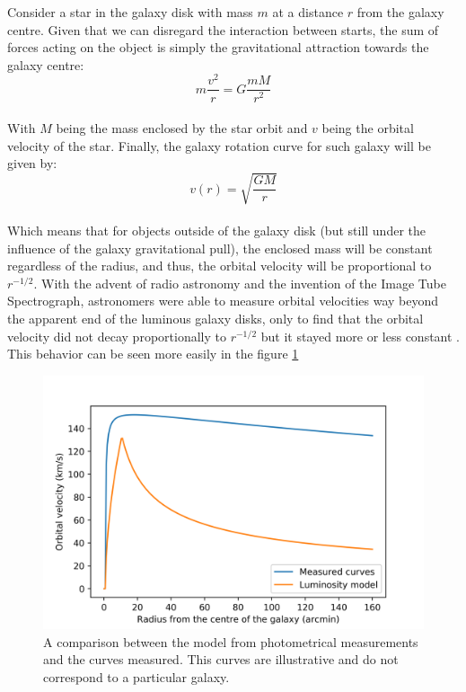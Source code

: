 Consider a star in the galaxy disk with mass $m$ at a distance $r$ from the galaxy centre. Given that we can disregard the interaction between starts, the sum of forces acting on the object is simply the gravitational attraction towards the galaxy centre:\\
\begin{equation}
\label{heh}
m\frac{v^2}{r} = G \frac{mM}{r^2}
\end{equation}\\

With $M$ being the mass enclosed by the star orbit and $v$ being the orbital velocity of the star. Finally, the galaxy rotation curve for such galaxy will be given by:\\

\begin{equation}
v(r) = \sqrt{\frac{GM}{r}}
\end{equation}\\

Which means that for objects outside of the galaxy disk (but still under the influence of the galaxy gravitational pull), the enclosed mass will be constant regardless of the radius, and thus, the orbital velocity will be proportional to $r^{-1/2}$. With the advent of radio astronomy and the invention of the Image Tube Spectrograph, astronomers were able to measure orbital velocities way beyond the apparent end of the luminous galaxy disks, only to find that the orbital velocity did not decay proportionally to $r^{-1/2}$ but it stayed more or less constant\cite{h21Line} \cite{galactoDistance} \cite{veraFirst}. This behavior can be seen more easily in the figure \ref{galaxyCurve}

\begin{figure}[h!]
    \centering
    \includegraphics[scale=0.8]{imag/galaxyRotCurv.png}
    \caption{A comparison between the model from photometrical measurements and the curves measured. This curves are illustrative and do not correspond to a particular galaxy.}
    \label{galaxyCurve}
\end{figure}


